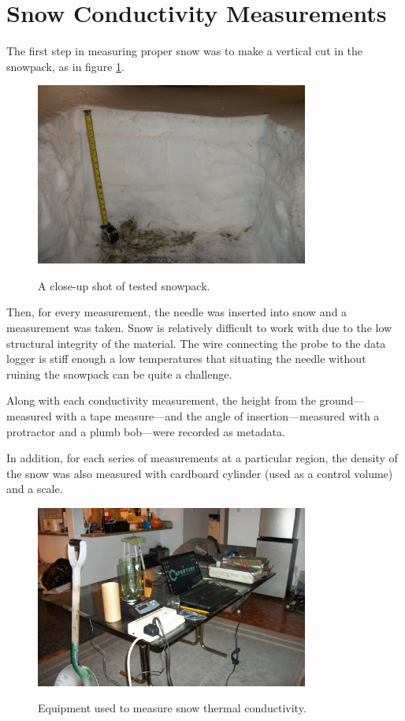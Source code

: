 \section{Snow Conductivity Measurements}

The first step in measuring proper snow was to make a vertical cut in the
snowpack, as in figure \ref{fig:snowpack}.

\begin{figure}[h]
\centering
\includegraphics[width=0.8\textwidth]{fig/snowpack.jpg}
\label{fig:snowpack}
\caption{A close-up shot of tested snowpack.}
\end{figure}

Then, for every measurement, the needle was inserted into snow and a measurement
was taken. Snow is relatively difficult to work with due to the low structural 
integrity of the material.  The wire connecting the probe to the data logger is
stiff enough a low temperatures that situating the needle without ruining the
snowpack can be quite a challenge.

Along with each conductivity measurement, the height from the ground---measured
with a tape measure---and the angle of insertion---measured with a protractor
and a plumb bob---were recorded as metadata.

In addition, for each series of measurements at a particular region, the density
of the snow was also measured with cardboard cylinder (used as a control volume)
and a scale.

\begin{figure}[h]
\centering
\includegraphics[width=0.8\textwidth]{fig/equipment.jpg}
\label{fig:equipment}
\caption{Equipment used to measure snow thermal conductivity.}
\end{figure}

